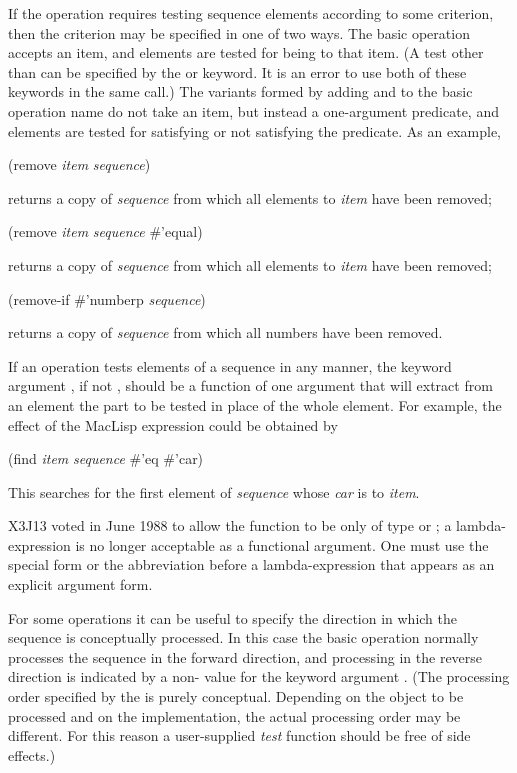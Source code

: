 If the operation requires testing sequence elements according to
some criterion, then the criterion may be specified in one of two ways.
The basic operation accepts an item,
and elements are tested for being  to that item.
(A test other than  can be specified by the 
or  keyword.  It is an error to use both
of these keywords in the same call.)
The variants formed by adding  and 
to the basic operation name do not take an item,
but instead a one-argument predicate,
and elements are tested for satisfying or not satisfying the predicate.
As an example,
\begin{lisp}
(remove {\it item} {\it sequence})
\end{lisp}
returns a copy of {\it sequence} from which all elements  to {\it item}
have been removed;
\begin{lisp}
(remove {\it item} {\it sequence}  \#'equal)
\end{lisp}
returns a copy of {\it sequence} from which all elements  to {\it item}
have been removed;
\begin{lisp}
(remove-if \#'numberp {\it sequence})
\end{lisp}
returns a copy of {\it sequence} from which all numbers have been removed.

If an operation tests elements of a sequence in any manner,
the keyword argument , if not {\false}, should be a function
of one argument that will extract from an element the part to be tested
in place of the whole element.
For example, the effect of the MacLisp expression
 could be obtained by
\begin{lisp}
(find {\it item} {\it sequence}  \#'eq  \#'car)
\end{lisp}
This searches for the first element of {\it sequence} whose {\it car} is 
to {\it item}.
\begin{newer}
X3J13 voted in June 1988  to allow the  function
to be only of type  or ; a lambda-expression
is no longer acceptable as a functional argument.  One must use the
 special form or the abbreviation  before
a lambda-expression that appears as an  explicit argument form.
\end{newer}

For some operations it can be useful to specify the direction
in which the sequence is conceptually processed.  In this case the basic
operation normally processes the sequence in the forward direction,
and processing in the reverse direction is indicated by a non-{\false}
value for the keyword argument .  (The processing order
specified by the  is purely conceptual.  Depending on
the object to be processed and on the implementation, the actual processing
order may be different.  For this reason a user-supplied {\it test} function
should be free of side effects.)

